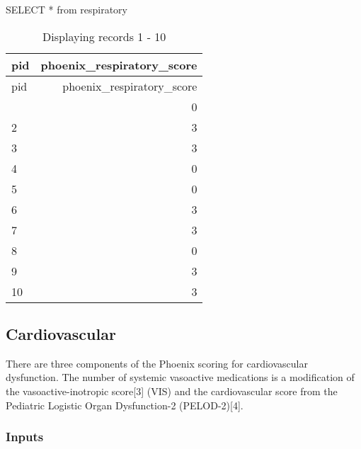 \documentclass[
  letterpaper,
  DIV=11,
  numbers=noendperiod]{scrartcl}
\newenvironment{Shaded}{\begin{snugshade}}{\end{snugshade}}
\newcommand{\KeywordTok}[1]{\textcolor[rgb]{0.00,0.23,0.31}{#1}}
\newcommand{\NormalTok}[1]{\textcolor[rgb]{0.00,0.23,0.31}{#1}}
\newcommand{\OperatorTok}[1]{\textcolor[rgb]{0.37,0.37,0.37}{#1}}
\begin{document}
\begin{Shaded}
\begin{Highlighting}[]
\KeywordTok{SELECT} \OperatorTok{*} \KeywordTok{from}\NormalTok{ respiratory}
\end{Highlighting}
\end{Shaded}

\begin{longtable}[]{@{}lr@{}}
\caption{Displaying records 1 - 10}\tabularnewline
\toprule\noalign{}
pid & phoenix\_respiratory\_score \\
\midrule\noalign{}
\endfirsthead
\toprule\noalign{}
pid & phoenix\_respiratory\_score \\
\midrule\noalign{}
\endhead
\bottomrule\noalign{}
\endlastfoot
1 & 0 \\
2 & 3 \\
3 & 3 \\
4 & 0 \\
5 & 0 \\
6 & 3 \\
7 & 3 \\
8 & 0 \\
9 & 3 \\
10 & 3 \\
\end{longtable}

\subsection{Cardiovascular}\label{cardiovascular}

There are three components of the Phoenix scoring for cardiovascular
dysfunction. The number of systemic vasoactive medications is a
modification of the vasoactive-inotropic score{[}3{]} (VIS) and the
cardiovascular score from the Pediatric Logistic Organ Dysfunction-2
(PELOD-2){[}4{]}.

\subsubsection{Inputs}\label{inputs-1}
\end{document}
